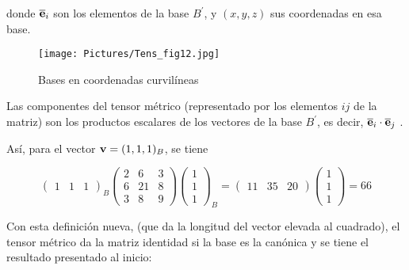 \bigskip 

 \noindent
 donde $ \overline {\bold{e}}_i  $ son  los elementos de la base $B^{\prime}$, y $(x,y,z)$  sus coordenadas en esa base.
 
 
 \bigskip 
 
\begin{figure}
\begin{center}
\texttt{[image: Pictures/Tens\_fig12.jpg]}
\caption{Bases en coordenadas curvilíneas}
\label{Tens_fig12}
\end{center}
\end{figure}
 
  Las componentes del tensor métrico (representado por los elementos $ij$ de la matriz) son los productos escalares de los vectores  de la base $B^{\prime}$, es decir, $\overline {\bold{e}}_i \cdot \overline {\bold{e}}_j$ .
  
  \bigskip 
  
 Así, para el vector $\bold{v}=(1,1,1)_{B}$, se tiene
 
  \bigskip 
  
  \begin{equation}
\left(\begin{array}{ccc} 1 & 1 & 1 
\end{array}
 \right)_{B} \left(\begin{array}{ccc} 2  & 6  & 3   \\ 6 & 21  & 8 \\ 3   & 8 & 9
\end{array}
 \right)  \left(\begin{array}{c} 1 \\1  \\1
\end{array}
 \right)_{B}=  \left(\begin{array}{ccc} 11 & 35 & 20
\end{array}
 \right)\left(\begin{array}{c} 1 \\1  \\1
\end{array}
 \right)=66   \label{tensormej}
\end{equation}
 
 
 \bigskip
 
 Con esta definición nueva, (que da la longitud del vector elevada al cuadrado), el tensor métrico da la matriz identidad si la base es la canónica y se tiene el resultado presentado al inicio: 

